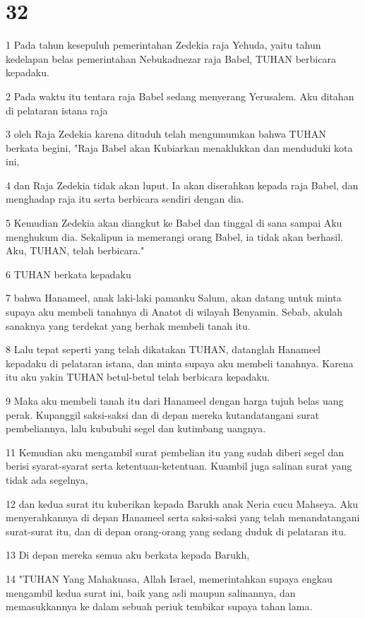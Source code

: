 \chapter{32}

\par 1 Pada tahun kesepuluh pemerintahan Zedekia raja Yehuda, yaitu tahun kedelapan belas pemerintahan Nebukadnezar raja Babel, TUHAN berbicara kepadaku.
\par 2 Pada waktu itu tentara raja Babel sedang menyerang Yerusalem. Aku ditahan di pelataran istana raja
\par 3 oleh Raja Zedekia karena dituduh telah mengumumkan bahwa TUHAN berkata begini, "Raja Babel akan Kubiarkan menaklukkan dan menduduki kota ini,
\par 4 dan Raja Zedekia tidak akan luput. Ia akan diserahkan kepada raja Babel, dan menghadap raja itu serta berbicara sendiri dengan dia.
\par 5 Kemudian Zedekia akan diangkut ke Babel dan tinggal di sana sampai Aku menghukum dia. Sekalipun ia memerangi orang Babel, ia tidak akan berhasil. Aku, TUHAN, telah berbicara."
\par 6 TUHAN berkata kepadaku
\par 7 bahwa Hanameel, anak laki-laki pamanku Salum, akan datang untuk minta supaya aku membeli tanahnya di Anatot di wilayah Benyamin. Sebab, akulah sanaknya yang terdekat yang berhak membeli tanah itu.
\par 8 Lalu tepat seperti yang telah dikatakan TUHAN, datanglah Hanameel kepadaku di pelataran istana, dan minta supaya aku membeli tanahnya. Karena itu aku yakin TUHAN betul-betul telah berbicara kepadaku.
\par 9 Maka aku membeli tanah itu dari Hanameel dengan harga tujuh belas uang perak. Kupanggil saksi-saksi dan di depan mereka kutandatangani surat pembeliannya, lalu kububuhi segel dan kutimbang uangnya.
\par 11 Kemudian aku mengambil surat pembelian itu yang sudah diberi segel dan berisi syarat-syarat serta ketentuan-ketentuan. Kuambil juga salinan surat yang tidak ada segelnya,
\par 12 dan kedua surat itu kuberikan kepada Barukh anak Neria cucu Mahseya. Aku menyerahkannya di depan Hanameel serta saksi-saksi yang telah menandatangani surat-surat itu, dan di depan orang-orang yang sedang duduk di pelataran itu.
\par 13 Di depan mereka semua aku berkata kepada Barukh,
\par 14 "TUHAN Yang Mahakuasa, Allah Israel, memerintahkan supaya engkau mengambil kedua surat ini, baik yang asli maupun salinannya, dan memasukkannya ke dalam sebuah periuk tembikar supaya tahan lama.
